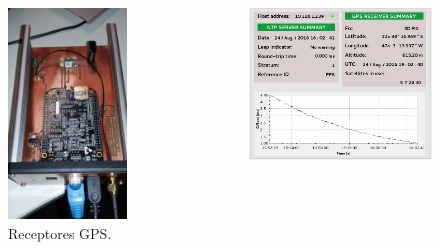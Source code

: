 \begin{frame}
\begin{columns}
\begin{column}{.5\textwidth}
\begin{figure}[h]
    \includegraphics[width=0.85\textwidth]{image/gps-ublox}
    \caption {Receptores GPS.}
    \label{img:gpses} 
\end{figure}
\end{column} 
\begin{column}{.5\textwidth}
\begin{figure}[h]
    \centering
    \includegraphics[width=\textwidth]{image/epics-opi-ntpgps}

\end{figure}
\end{column}
\end{columns}
\end{frame}
